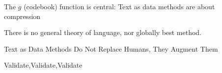 \documentclass{beamer}
\numberwithin{equation}{section}
\begin{document}
\begin{frame}

\huge

The $g$ (codebook) function is central: Text as data methods are about compression \pause \\



\end{frame}


\begin{frame}

\huge 

There is no general theory of language, nor globally best method.

\end{frame}


\begin{frame}

\huge 

Text as Data Methods Do Not Replace Humans, They Augment Them


\end{frame}



\begin{frame}
\huge 

Validate,Validate,Validate

\end{frame}
\end{document}
